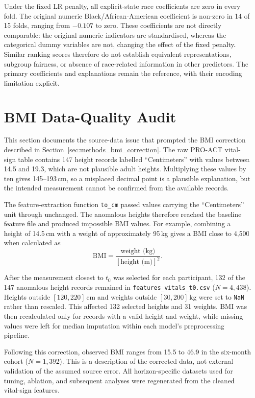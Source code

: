 Under the fixed LR penalty, all explicit-state race coefficients are zero in every fold. The original numeric Black/African-American coefficient is non-zero in 14 of 15 folds, ranging from $-0.107$ to zero. These coefficients are not directly comparable: the original numeric indicators are standardised, whereas the categorical dummy variables are not, changing the effect of the fixed penalty. Similar ranking scores therefore do not establish equivalent representations, subgroup fairness, or absence of race-related information in other predictors. The primary coefficients and explanations remain the reference, with their encoding limitation explicit.


\section{BMI Data-Quality Audit}
\label{app:bmi_correction}

This section documents the source-data issue that prompted the \gls{BMI} correction described in Section~\ref{sec:methods_bmi_correction}. The raw \gls{PRO-ACT} vital-sign table contains 147 height records labelled ``Centimeters'' with values between 14.5 and 19.3, which are not plausible adult heights. Multiplying these values by ten gives 145--193\,cm, so a misplaced decimal point is a plausible explanation, but the intended measurement cannot be confirmed from the available records.

The feature-extraction function \texttt{to\_cm} passed values carrying the ``Centimeters'' unit through unchanged. The anomalous heights therefore reached the baseline feature file and produced impossible BMI values. For example, combining a height of 14.5\,cm with a weight of approximately 95\,kg gives a BMI close to 4{,}500 when calculated as
\[
  \text{BMI} = \frac{\text{weight (kg)}}{[\text{height (m)}]^2}.
\]

After the measurement closest to $t_0$ was selected for each participant, 132 of the 147 anomalous height records remained in \texttt{features\_vitals\_t0.csv} ($N=4{,}438$). Heights outside $[120,220]$\,cm and weights outside $[30,200]$\,kg were set to \texttt{NaN} rather than rescaled. This affected 132 selected heights and 31 weights. BMI was then recalculated only for records with a valid height and weight, while missing values were left for median imputation within each model's preprocessing pipeline.

Following this correction, observed BMI ranges from 15.5 to 46.9 in the six-month cohort ($N=1{,}392$). This is a description of the corrected data, not external validation of the assumed source error. All horizon-specific datasets used for tuning, ablation, and subsequent analyses were regenerated from the cleaned vital-sign features.


